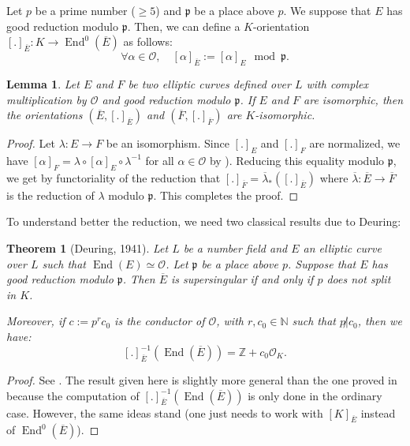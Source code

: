 \documentclass[a4paper,10pt,notitlepage]{report}
\theoremstyle{definition}
\theoremstyle{plain}
\newtheorem{Lemma}[Definition]{Lemma}
\newtheorem{Theorem}[Definition]{Theorem}
\theoremstyle{definition}
\newcommand{\N}{\mathbb{N}}
\newcommand{\Z}{\mathbb{Z}}
\newcommand{\mO}{\mathcal{O}}
\renewcommand{\(}{\left(}
\renewcommand{\)}{\right)}
\newcommand{\mfp}{\mathfrak{p}}
\DeclareMathOperator{\End}{End}
\begin{document}
Let $p$ be a prime number ($\geq 5$) and $\mfp$ be a place above $p$.  We suppose that $E$ has good reduction modulo $\mfp$. Then, we can define a $K$-orientation $[.]_{\overline{E}}: K\longrightarrow \End^0(\overline{E})$ as follows:
\[\forall \alpha\in \mO, \quad [\alpha]_{\overline{E}}:=[\alpha]_E \mod \mfp.\]

\begin{Lemma}
Let $E$ and $F$ be two elliptic curves defined over $L$ with complex multiplication by $\mO$ and good reduction modulo $\mfp$.  If $E$ and $F$ are isomorphic,  then the orientations $(\overline{E},[.]_{\overline{E}})$ and $(\overline{F},[.]_{\overline{F}})$ are $K$-isomorphic.
\end{Lemma}

\begin{proof}
Let $\lambda : E\longrightarrow F$ be an isomorphism.  Since $[.]_E$ and $[.]_F$ are normalized, we have  $[\alpha]_F=\lambda\circ[\alpha]_E\circ\lambda^{-1}$ for all $\alpha\in\mO$ by \cite[Corollary II.1.1.1]{Silverman2}).  Reducing this equality modulo $\mfp$, we get by functoriality of the reduction that $[.]_{\overline{F}}=\overline{\lambda}_*([.]_{\overline{E}})$ where $\overline{\lambda}:\overline{E}\longrightarrow\overline{F}$ is the reduction of $\lambda$ modulo $\mfp$.  This completes the proof.
\end{proof}

To understand better the reduction, we need two classical results due to Deuring:

\begin{Theorem}[Deuring, 1941]\label{Theorem 1}
Let $L$ be a number field and $E$ an elliptic curve over $L$ such that $\End(E)\simeq \mO$.  Let $\mfp$ be a place above $p$. Suppose that $E$ has good reduction modulo $\mfp$.  Then $\overline{E}$ is supersingular if and only if $p$ does not split in $K$.  

Moreover,  if $c:=p^r c_0$ is the conductor of $\mO$, with $r,c_0\in\N$ such that $p\not|c_0$, then we have:
\[[.]_{\overline{E}}^{-1}(\End(\overline{E}))=\Z+c_0\mO_K.\]
\end{Theorem}

\begin{proof}
See \cite[chapter 13, Theorem 12]{Lang_EF}.  The result given here is slightly more general than the one proved in \cite{Lang_EF} because the computation of $[.]_{\overline{E}}^{-1}(\End(\overline{E}))$ is only done in the ordinary case. However, the same ideas stand (one just needs to work with $[K]_{\overline{E}}$ instead of $\End^0(\overline{E})$).
\end{proof}
\end{document}
